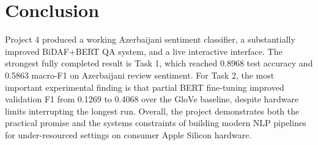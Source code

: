 \documentclass[11pt]{article}
\begin{document}
\section{Conclusion}
Project 4 produced a working Azerbaijani sentiment classifier, a substantially improved BiDAF+BERT QA system, and a live interactive interface. The strongest fully completed result is Task 1, which reached 0.8968 test accuracy and 0.5863 macro-F1 on Azerbaijani review sentiment. For Task 2, the most important experimental finding is that partial BERT fine-tuning improved validation F1 from 0.1269 to 0.4068 over the GloVe baseline, despite hardware limits interrupting the longest run. Overall, the project demonstrates both the practical promise and the systems constraints of building modern NLP pipelines for under-resourced settings on consumer Apple Silicon hardware.
\end{document}
